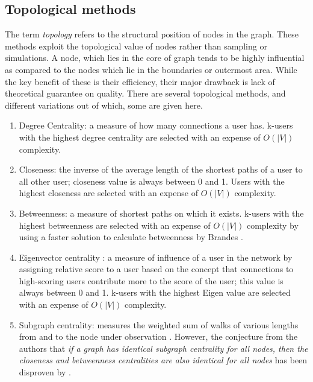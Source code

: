 		\subsection{Topological methods}
		The term \textit{topology} refers to the structural position of nodes in the graph. These methods exploit the topological value of nodes rather than sampling or simulations. A node, which lies in the core of graph tends to be highly influential as compared to the nodes which lie in the boundaries or outermost area. While the key benefit of these is their efficiency, their major drawback is lack of theoretical guarantee on quality. There are several topological methods, and different variations out of which, some are given here.
		
		\begin{enumerate}
			\item Degree Centrality: a measure of how many connections a user has. k-users with the highest degree centrality are selected with an expense of $O(|V|)$ complexity.
			
			\item Closeness: the inverse of the average length of the shortest paths of a user to all other user; closeness value is always between 0 and 1. Users with the highest closeness are selected with an expense of $O(|V|)$ complexity.
			
			\item Betweenness: a measure of shortest paths on which it exists. k-users with the highest betweenness are selected with an expense of $O(|V|)$ complexity by using a faster solution to calculate betweenness by Brandes \cite{brandes2001}.
			
			\item Eigenvector centrality \cite{bonacich1987}: a measure of influence of a user in the network by assigning relative score to a user based on the concept that connections to high-scoring users contribute more to the score of the user; this value is always between 0 and 1. k-users with the highest Eigen value are selected with an expense of $O(|V|)$ complexity.
			
			\item Subgraph centrality: measures the weighted sum of walks of various lengths from and to the node under observation \cite{estrada2005}. However, the conjecture from the authors that \textit{if a graph has identical subgraph centrality for all nodes, then the closeness and betweenness centralities are also identical for all nodes} has been disproven by \cite{stevanovic2013}.
			

\end{enumerate}
